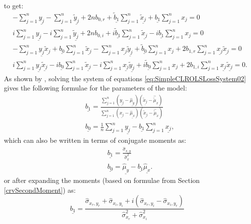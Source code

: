 \documentclass[
]{book}
\begin{document}
to get:
\begin{equation}
    \begin{aligned}
        & - \sum_{j=1}^n \underline{y_j} - \sum_{j=1}^n \underline{\tilde{y}_j} + 2 n b_{0,r} + \underline{\tilde{b}_1} \sum_{j=1}^n \underline{\tilde{x}_j} + \underline{b_1} \sum_{j=1}^n {x}_j = 0 \\
        & i \sum_{j=1}^n \underline{y_j} - i \sum_{j=1}^n \underline{\tilde{y}_j} + 2 n b_{0,i} + i \underline{\tilde{b}_1} \sum_{j=1}^n \underline{\tilde{x}_j} - i \underline{b_1} \sum_{j=1}^n {x}_j = 0 \\
        & - \sum_{j=1}^n \underline{y_j} \underline{\tilde{x}_j} + \underline{b_0} \sum_{j=1}^n \underline{\tilde{x}_j} - \sum_{j=1}^n \underline{x_j} \underline{\tilde{y}_j} + \underline{\tilde{b}_0} \sum_{j=1}^n {x}_j + 2 b_{1,r} \sum_{j=1}^n \underline{x_j} \underline{\tilde{x}_j} = 0 \\
        & i \sum_{j=1}^n \underline{y_j} \underline{\tilde{x}_j} - i \underline{b_0} \sum_{j=1}^n \underline{\tilde{x}_j} - i \sum_{j=1}^n \underline{x_j} \underline{\tilde{y}_j} + i \underline{\tilde{b}_0} \sum_{j=1}^n {x}_j + 2 b_{1,i} \sum_{j=1}^n \underline{x_j} \underline{\tilde{x}_j} = 0 .
    \end{aligned}
    \label{eq:SimpleCLROLSLossSystem02}
\end{equation}
As shown by \citet{Svetunkov2012}, solving the system of equations \eqref{eq:SimpleCLROLSLossSystem02} gives the following formulae for the parameters of the model:
\begin{equation}
    \begin{aligned}
        & \underline{b_1} = \frac{\sum_{j=1}^n (\underline{y_j}-\underline{\hat{\mu}_{y}}) (\underline{\tilde{x}_j}-\hat{\tilde{\mu}}_{x})}{\sum_{j=1}^n (\underline{{x}_j}-\underline{\hat{\mu}_{x}}) (\underline{\tilde{x}_j}-\hat{\tilde{\mu}}_{x})} \\
        & \underline{b_0} = \frac{1}{n} \sum_{j=1}^n \underline{y_j} - \underline{b_1} \sum_{j=1}^n \underline{x_j} ,
    \end{aligned}
    \label{eq:SimpleCLROLSLossParameters}
\end{equation}
which can also be written in terms of conjugate moments as:
\begin{equation}
    \begin{aligned}
        & \underline{b_1} = \frac{\hat{\sigma}_{x,y}}{\hat{\sigma}_x^2} \\
        & \underline{b_0} = \underline{\hat{\mu}_{y}} - \underline{b_1} \underline{\hat{\mu}_{x}} .
    \end{aligned}
    \label{eq:SimpleCLROLSLossParametersMoments}
\end{equation}
or after expanding the moments (based on formulae from Section \ref{crvSecondMoment}) as:
\begin{equation}
        \underline{b_1} = \frac{\hat{\sigma}_{x_r, y_r} + \hat{\sigma}_{x_i, y_i} + i (\hat{\sigma}_{x_r, y_i} - \hat{\sigma}_{x_i, y_r})}{\hat{\sigma}_{x_r}^2 + \hat{\sigma}_{x_i}^2}
    \label{eq:SimpleCLROLSLossParametersMomentsExpanded}
\end{equation}
\end{document}
